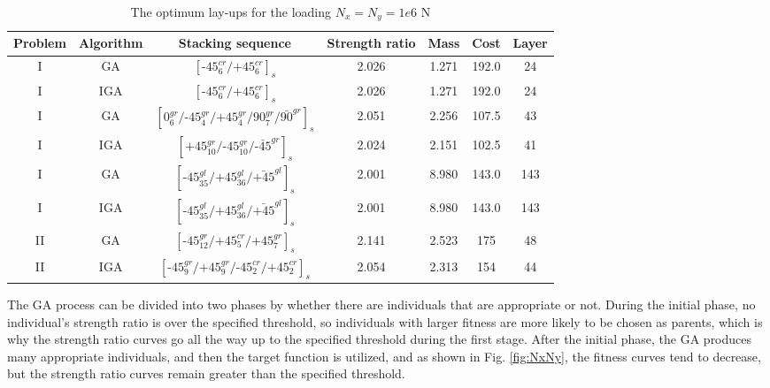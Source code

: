 \documentclass[Afour,sagev,times]{sagej}
\begin{document}
\begin{table}[!htb]
\caption{The optimum lay-ups for the loading $N_x=N_y=1e6$ N}
\centering
\begin{adjustbox}{width=1\textwidth}
\begin{tabular}{ccccccc}
	\toprule
	 Problem  &   Algorithm      & Stacking sequence                                    & Strength ratio  & Mass  &  Cost   & Layer    \\ 
	\midrule																								  
	      I   &  GA   &  $[\text{-}45_{6}^{cr}/\text{+}45_{6}^{cr}]_s$                        & 2.026           & 1.271 &  192.0  & 24  \\
	      I   &  IGA   &  $[\text{-}45_{6}^{cr}/\text{+}45_{6}^{cr}]_s$                        & 2.026           & 1.271 &  192.0  & 24  \\
	      I   &  GA    &  $[0_6^{gr}/\text{-}45_{4}^{gr}/\text{+}45_{4}^{gr}/90_{7}^{gr}/\bar{90}^{gr}]_s$     & 2.051           & 2.256 &  107.5  & 43  \\
	      I   &  IGA    &  $[\text{+}45_{10}^{gr}/\text{-}45_{10}^{gr}/\bar{\text{-}45}^{gr}]_s$    & 2.024           & 2.151 &  102.5  & 41  \\
	      I   &  GA    &  $[\text{-}45_{35}^{gl}/\text{+}45_{36}^{gl}/\bar{\text{+}45}^{gl}]_s$    & 2.001           & 8.980 &  143.0  & 143  \\
	      I   &  IGA    &  $[\text{-}45_{35}^{gl}/\text{+}45_{36}^{gl}/\bar{\text{+}45}^{gl}]_s$    & 2.001           & 8.980 &  143.0  & 143  \\
	      II  &  GA    &
	$[\text{-}45_{12}^{gr}/\text{+}45_{5}^{cr}/\text{+}45_{7}^{gr}]_s$         & 2.141
										  & 2.523 & 175& 48  \\
	      II  &  IGA    &
	$[\text{-}45_{9}^{gr}/\text{+}45_{9}^{gr}/\text{-}45_{2}^{cr}/\text{+}45_{2}^{cr}]_s$         & 2.054
										  & 2.313 & 154& 44  \\
	\bottomrule
\end{tabular}
\end{adjustbox}
\label{tab:NxNy}
\end{table}

The GA process can be divided into two phases by whether there are individuals that are appropriate
or not. During the initial phase, no individual's strength ratio is over the specified threshold, so
individuals with larger fitness are more likely to be chosen as parents, which is why the strength
ratio curves go all the way up to the specified threshold during the first stage. After the initial
phase, the GA produces many appropriate individuals, and then the target function is utilized, and
as shown in Fig. \ref{fig:NxNy}, the fitness curves tend to decrease, but the
strength ratio curves remain greater than the specified threshold.
\end{document}
